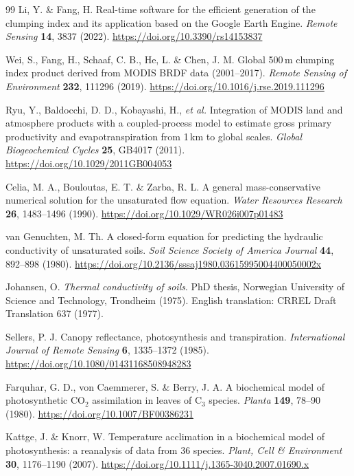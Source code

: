 \begin{thebibliography}{99}
Li, Y. \& Fang, H.
Real-time software for the efficient generation of the clumping index and its
application based on the Google Earth Engine. \emph{Remote Sensing} \textbf{14},
3837 (2022). \url{https://doi.org/10.3390/rs14153837}

Wei, S., Fang, H., Schaaf, C. B., He, L. \& Chen, J. M.
Global 500\,m clumping index product derived from MODIS BRDF data (2001--2017).
\emph{Remote Sensing of Environment} \textbf{232}, 111296 (2019).
\url{https://doi.org/10.1016/j.rse.2019.111296}

Ryu, Y., Baldocchi, D. D., Kobayashi, H., \emph{et al.}
Integration of MODIS land and atmosphere products with a coupled-process model to
estimate gross primary productivity and evapotranspiration from 1\,km to global
scales. \emph{Global Biogeochemical Cycles} \textbf{25}, GB4017 (2011).
\url{https://doi.org/10.1029/2011GB004053}

Celia, M. A., Bouloutas, E. T. \& Zarba, R. L.
A general mass-conservative numerical solution for the unsaturated flow equation.
\emph{Water Resources Research} \textbf{26}, 1483--1496 (1990).
\url{https://doi.org/10.1029/WR026i007p01483}

van Genuchten, M. Th.
A closed-form equation for predicting the hydraulic conductivity of unsaturated
soils. \emph{Soil Science Society of America Journal} \textbf{44}, 892--898 (1980).
\url{https://doi.org/10.2136/sssaj1980.03615995004400050002x}

Johansen, O.
\emph{Thermal conductivity of soils}. PhD thesis, Norwegian University of Science
and Technology, Trondheim (1975). English translation: CRREL Draft Translation
637 (1977).

Sellers, P. J.
Canopy reflectance, photosynthesis and transpiration.
\emph{International Journal of Remote Sensing} \textbf{6}, 1335--1372 (1985).
\url{https://doi.org/10.1080/01431168508948283}

Farquhar, G. D., von Caemmerer, S. \& Berry, J. A.
A biochemical model of photosynthetic CO$_2$ assimilation in leaves of C$_3$
species. \emph{Planta} \textbf{149}, 78--90 (1980).
\url{https://doi.org/10.1007/BF00386231}

Kattge, J. \& Knorr, W.
Temperature acclimation in a biochemical model of photosynthesis: a reanalysis of
data from 36 species. \emph{Plant, Cell \& Environment} \textbf{30}, 1176--1190
(2007). \url{https://doi.org/10.1111/j.1365-3040.2007.01690.x}


\end{thebibliography}
